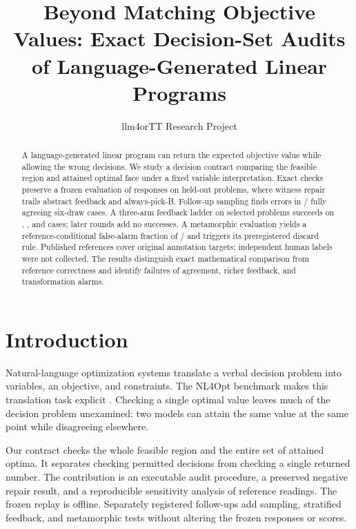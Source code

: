 \documentclass[letterpaper]{article}
\title{Beyond Matching Objective Values: Exact Decision-Set Audits of Language-Generated Linear Programs}
\author{llm4orTT Research Project}
\begin{document}
\maketitle
\begin{abstract}
A language-generated linear program can return the expected objective value while allowing the wrong decisions. We study a decision contract comparing the feasible region and attained optimal face under a fixed variable interpretation. Exact checks preserve a frozen evaluation of \ResponseN{} responses on \HeldoutN{} held-out problems, where witness repair trails abstract feedback and always-pick-B. Follow-up sampling finds errors in \ConsWrong{}/\ConsAgree{} fully agreeing six-draw cases. A three-arm feedback ladder on \LadderN{} selected problems succeeds on \VerdictK{}, \PointK{}, and \AnchorK{} cases; later rounds add no successes. A metamorphic evaluation yields a reference-conditional false-alarm fraction of \FalseK{}/\FlagN{} and triggers its preregistered discard rule. Published references cover \ReferenceN{} original annotation targets; independent human labels were not collected. The results distinguish exact mathematical comparison from reference correctness and identify failures of agreement, richer feedback, and transformation alarms.
\end{abstract}

\section{Introduction}
Natural-language optimization systems translate a verbal decision problem into variables, an objective, and constraints. The NL4Opt benchmark makes this translation task explicit \citep{ramamonjison2022nl4opt}. Checking a single optimal value leaves much of the decision problem unexamined: two models can attain the same value at the same point while disagreeing elsewhere.

Our contract checks the whole feasible region and the entire set of attained optima. It separates checking permitted decisions from checking a single returned number. The contribution is an executable audit procedure, a preserved negative repair result, and a reproducible sensitivity analysis of reference readings. The frozen replay is offline. Separately registered follow-ups add sampling, stratified feedback, and metamorphic tests without altering the frozen responses or scores.
\end{document}
